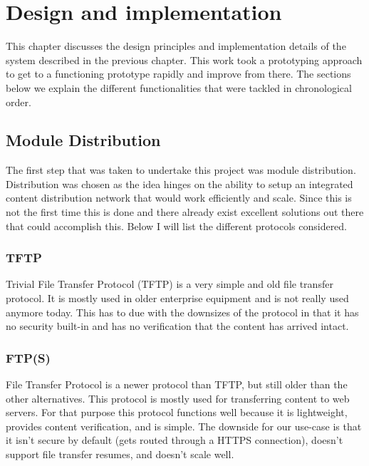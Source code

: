 \chapter{Design and implementation}


This chapter discusses the design principles and implementation details of the system described in the previous chapter. This work took a prototyping approach to get to a functioning prototype rapidly and improve from there. The sections below we explain the different functionalities that were tackled in chronological order.

\section{Module Distribution}

The first step that was taken to undertake this project was module distribution. Distribution was chosen as the idea hinges on the ability to setup an integrated content distribution network that would work efficiently and scale. Since this is not the first time this is done and there already exist excellent solutions out there that could accomplish this. Below I will list the different protocols considered.

\subsection{TFTP}
Trivial File Transfer Protocol (TFTP) is a very simple and old file transfer protocol. It is mostly used in older enterprise equipment and is not really used anymore today. This has to due with the downsizes of the protocol in that it has no security built-in and has no verification that the content has arrived intact.

\subsection{FTP(S)}
File Transfer Protocol is a newer protocol than TFTP, but still older than the other alternatives. This protocol is mostly used for transferring content to web servers. For that purpose this protocol functions well because it is lightweight, provides content verification, and is simple. The downside for our use-case is that it isn't secure by default (gets routed through a HTTPS connection), doesn't support file transfer resumes, and doesn't scale well.

